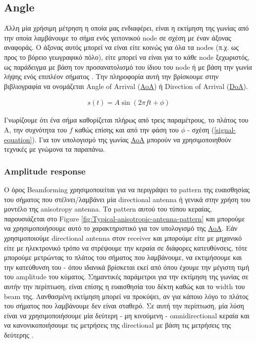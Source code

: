 \subsection{Angle}\label{sec:Chapter2-1-2}
Άλλη μία χρήσιμη μέτρηση η οποία μας ενδιαφέρει, είναι η εκτίμηση της γωνίας από την οποία λαμβάνουμε το σήμα ενός γειτονικού
node σε σχέση με έναν άξονας αναφοράς. Ο άξονας αυτός μπορεί να είναι είτε κοινώς για όλα τα nodes (π.χ. ως προς το βόρειο γεωγραφικό πόλο),
είτε μπορεί να είναι για το κάθε node ξεχωριστός, ως παράδειγμα με βάση τον προσανατολισμό του ίδιου του node ή με βάση την γωνία λήψης ενός 
επιπλέον σήματος \cite{wsn-Localization-systems}. Την πληροφορία αυτή την βρίσκουμε στην βιβλιογραφία να ονομάζεται Angle of Arrival 
(\hyperref[abbr:AoA]{AoA}) ή Direction of Arrival (\hyperref[abbr:DoA]{DoA}). 

\begin{align}
	s(t)=A\sin(2\pi ft + \phi) \label{signal-equation}
\end{align}

Γνωρίζουμε ότι ένα σήμα καθορίζεται πλήρως από τρεις παραμέτρους, το πλάτος του A, την συχνότητα του $f$ καθώς 
επίσης και από την φάση του $\phi$ - σχέση (\ref{signal-equation}). Για τον υπολογισμό της γωνίας \hyperref[abbr:AoA]{AoA} μπορούν 
να χρησιμοποιηθούν τεχνικές με γνώμονα τα παραπάνω. 

\subsubsection{Amplitude response}
Ο όρος Beamforming \cite{wikipedia-beamforming} χρησιμοποιείται για να περιγράψει το pattern 
της ευαισθησίας του σήματος που στέλνει/λαμβάνει μία directional antenna \cite{wikipedia-directionl-antenna} ή γενικά στην χρήση του μοντέλο 
της anisotropy antenna. Το pattern αυτού του τύπου κεραίας, παρουσιάζεται στο Figure \ref{fig:Typical-anisotropic-antenna-pattern}
\cite{wsn-Localization-techniques} και μπορούμε να χρησιμοποιήσουμε αυτό το χαρακτηριστικό για τον υπολογισμό της \hyperref[abbr:AoA]{AoA}. 
Εάν χρησιμοποιούμε directional antenna στον receiver και μπορούμε είτε με μηχανικό είτε με ηλεκτρονικό τρόπο να στρέψουμε
την κεραία σε διάφορες κατευθύνσεις, τότε μπορούμε μετρώντας το πλάτος του σήματος που λαμβάνουμε, να εκτιμήσουμε και την κατεύθυνση του - όπου ιδανικά
βρίσκεται εκεί από όπου έχουμε την μέγιστη τιμή του amplitude του κύματος. Σημαντικές παράμετροι για την εκτίμηση της γωνίας σε αυτήν την περίπτωση, 
είναι επίσης η ευαισθησία του δέκτη καθώς και το width του beam της. 
Λανθασμένη εκτίμηση μπορεί να προκύψει, αν για κάποιο λόγο το πλάτος του σήματος που λαμβάνουμε δεν είναι σταθερό. Σε αυτή την περίπτωση, μία λύση
είναι να χρησιμοποιήσουμε μία δεύτερη - μη κινούμενη - omnidirectional κεραία και να κανονικοποιήσουμε τις μετρήσεις της directional με βάση τις   
μετρήσεις της δεύτερης \cite{wsn-Localization-techniques}.

